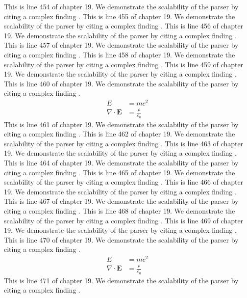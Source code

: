 This is line 454 of chapter 19. We demonstrate the scalability of the parser by citing a complex finding \cite{ref19_454}.
This is line 455 of chapter 19. We demonstrate the scalability of the parser by citing a complex finding \cite{ref19_455}.
This is line 456 of chapter 19. We demonstrate the scalability of the parser by citing a complex finding \cite{ref19_456}.
This is line 457 of chapter 19. We demonstrate the scalability of the parser by citing a complex finding \cite{ref19_457}.
This is line 458 of chapter 19. We demonstrate the scalability of the parser by citing a complex finding \cite{ref19_458}.
This is line 459 of chapter 19. We demonstrate the scalability of the parser by citing a complex finding \cite{ref19_459}.
This is line 460 of chapter 19. We demonstrate the scalability of the parser by citing a complex finding \cite{ref19_460}.
\begin{align*}
  E &= mc^2 \\
  \nabla \cdot \mathbf{E} &= \frac{\rho}{\varepsilon_0}
\end{align*}
This is line 461 of chapter 19. We demonstrate the scalability of the parser by citing a complex finding \cite{ref19_461}.
This is line 462 of chapter 19. We demonstrate the scalability of the parser by citing a complex finding \cite{ref19_462}.
This is line 463 of chapter 19. We demonstrate the scalability of the parser by citing a complex finding \cite{ref19_463}.
This is line 464 of chapter 19. We demonstrate the scalability of the parser by citing a complex finding \cite{ref19_464}.
This is line 465 of chapter 19. We demonstrate the scalability of the parser by citing a complex finding \cite{ref19_465}.
This is line 466 of chapter 19. We demonstrate the scalability of the parser by citing a complex finding \cite{ref19_466}.
This is line 467 of chapter 19. We demonstrate the scalability of the parser by citing a complex finding \cite{ref19_467}.
This is line 468 of chapter 19. We demonstrate the scalability of the parser by citing a complex finding \cite{ref19_468}.
This is line 469 of chapter 19. We demonstrate the scalability of the parser by citing a complex finding \cite{ref19_469}.
This is line 470 of chapter 19. We demonstrate the scalability of the parser by citing a complex finding \cite{ref19_470}.
\begin{align*}
  E &= mc^2 \\
  \nabla \cdot \mathbf{E} &= \frac{\rho}{\varepsilon_0}
\end{align*}
This is line 471 of chapter 19. We demonstrate the scalability of the parser by citing a complex finding \cite{ref19_471}.
